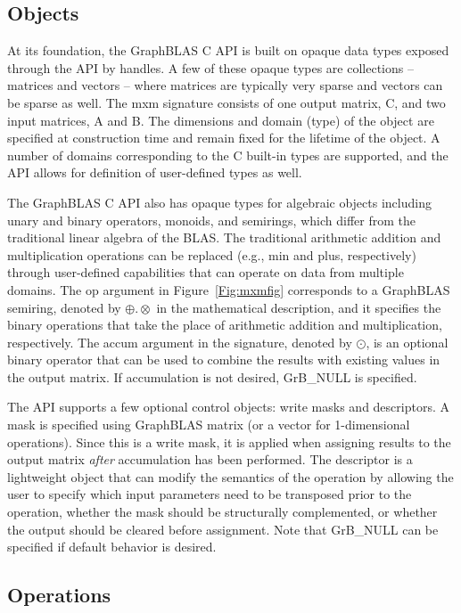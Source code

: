 \subsection{Objects}

At its foundation, the GraphBLAS C API is built on opaque data types exposed
through the API by handles.  
A few of these opaque types are collections -- matrices and vectors --
where matrices are typically very sparse and vectors can be
sparse as well.  The {\sf mxm} signature consists of one output matrix, {\sf C}, and 
two input matrices, {\sf A} and {\sf B}. The dimensions and 
domain (type) of the object are specified at construction time and remain fixed for the lifetime of 
the object.  A number of domains corresponding to the C built-in types are
supported, and the API allows for definition of user-defined types as well.

The GraphBLAS C API also has opaque types for algebraic objects including
unary and binary operators, monoids, and semirings, which differ from the traditional
linear algebra of the BLAS.  The traditional arithmetic addition and
multiplication operations can be replaced (e.g., min and plus, respectively) through
user-defined capabilities that can operate on data from multiple domains.  The {\sf op} 
argument in Figure~\ref{Fig:mxmfig} corresponds to a GraphBLAS semiring, denoted by $\oplus.\otimes$ in the 
mathematical description, and it specifies the binary operations that take the 
place of arithmetic addition and multiplication, respectively. The {\sf accum}
argument in the signature, denoted by $\odot$, is an optional binary operator that can
be used to combine the results with existing values in the output matrix. If accumulation
is not desired, {\sf GrB\_NULL} is specified.

The API supports a few optional control objects: write masks and descriptors.  A
mask is specified using GraphBLAS matrix (or a vector for 1-dimensional operations).
Since this is a write mask, it is applied when assigning results to the output matrix
{\em after} accumulation has been performed.
The descriptor is a lightweight object that can modify the semantics of the
operation by allowing the user to specify which input parameters need to be transposed
prior to the operation, whether the mask should be structurally complemented, or whether
the output should be cleared before assignment.
Note that {\sf GrB\_NULL} can be specified if default behavior is desired.

\subsection{Operations}

